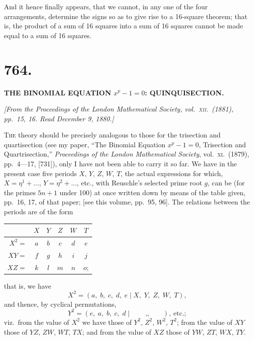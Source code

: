 \documentclass[11pt,a4paper]{book}
\begin{document}
And it hence finally appears, that we cannot, in any one of the four arrangements, determine the signs so as to give rise to a 16-square theorem; that is, the product of a sum of 16 squares into a sum of 16 squares cannot be made equal to a sum of 16 squares.

\newpage

\section*{764.}

\begin{center}
\textbf{THE BINOMIAL EQUATION $x^p - 1 = 0$: QUINQUISECTION.}
\end{center}

\noindent\textit{[From the \textit{Proceedings of the London Mathematical Society}, vol.\ \textsc{xii}.\ (1881), pp.\ 15, 16. Read December 9, 1880.]}

\vspace{\baselineskip}

\textsc{The} theory should be precisely analogous to those for the trisection and quartisection (see my paper, ``The Binomial Equation $x^p - 1 = 0$, Trisection and Quartrisection,'' \textit{Proceedings of the London Mathematical Society}, vol.\ \textsc{xi}.\ (1879), pp.\ 4---17, [731]), only I have not been able to carry it so far. We have in the present case five periods $X$, $Y$, $Z$, $W$, $T$, the actual expressions for which, $X = \eta^1 + \ldots$, $Y = \eta^2 + \ldots$, etc., with Reuschle's selected prime root $g$, can be (for the primes $5n + 1$ under 100) at once written down by means of the table given, pp.\ 16, 17, of that paper; [see this volume, pp.\ 95, 96]. The relations between the periods are of the form
\begin{center}
\begin{tabular}{r | c c c c c}
& $X$ & $Y$ & $Z$ & $W$ & $T$ \\ \hline
$X^2 =$ & $a$ & $b$ & $c$ & $d$ & $e$ \\
$XY =$ & $f$ & $g$ & $h$ & $i$ & $j$ \\
$XZ =$ & $k$ & $l$ & $m$ & $n$ & $o$;
\end{tabular}
\end{center}
that is, we have
\[
X^2 = (a,\; b,\; c,\; d,\; e \mid X,\; Y,\; Z,\; W,\; T),
\]
and thence, by cyclical permutations,
\[
Y^2 = (e,\; a,\; b,\; c,\; d \mid \quad\quad \text{,,}\quad\quad ),\ \text{etc.};
\]
viz.\ from the value of $X^2$ we have those of $Y^2$, $Z^2$, $W^2$, $T^2$; from the value of $XY$ those of $YZ$, $ZW$, $WT$, $TX$; and from the value of $XZ$ those of $YW$, $ZT$, $WX$, $TY$.
\end{document}

